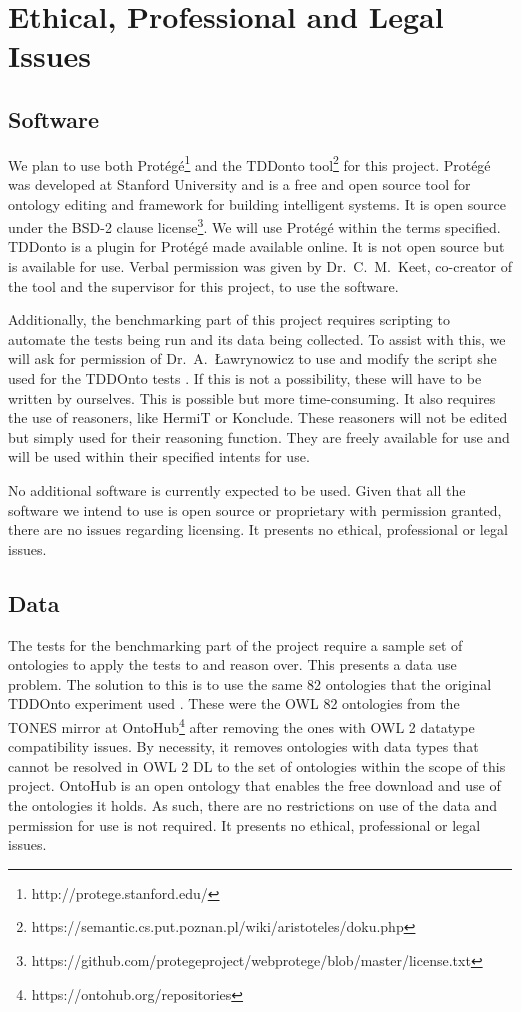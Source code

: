 \documentclass[draft]{sig-alternate}
\begin{document}
\section{Ethical, Professional and Legal Issues}

\subsection{Software}

We plan to use both Prot\'eg\'e\footnote{http://protege.stanford.edu/} and the TDDonto tool\footnote{https://semantic.cs.put.poznan.pl/wiki/aristoteles/doku.php} for this project. Prot\'eg\'e was developed at Stanford University and is a free and open source tool for ontology editing and framework for building intelligent systems. It is open source under the BSD-2 clause license\footnote{https://github.com/protegeproject/webprotege/blob/master/license.txt}. We will use Prot\'eg\'e within the terms specified. TDDonto is a plugin for Prot\'eg\'e made available online. It is not open source but is available for use. Verbal permission was given by Dr.\ C.\ M.\ Keet, co-creator of the tool and the supervisor for this project, to use the software.

Additionally, the benchmarking part of this project requires scripting to automate the tests being run and its data being collected. To assist with this, we will ask for permission of Dr.\ A.\ {\L}awrynowicz to use and modify the script she used for the TDDOnto tests \cite{DBLP:conf/dlog/LawrynowiczK16}. If this is not a possibility, these will have to be written by ourselves. This is possible but more time-consuming. It also requires the use of reasoners, like HermiT or Konclude. These reasoners will not be edited but simply used for their reasoning function. They are freely available for use and will be used within their specified intents for use.

No additional software is currently expected to be used. Given that all the software we intend to use is open source or proprietary with permission granted, there are no issues regarding licensing. It presents no ethical, professional or legal issues.

\subsection{Data}

The tests for the benchmarking part of the project require a sample set of ontologies to apply the tests to and reason over. This presents a data use problem. The solution to this is to use the same 82 ontologies that the original TDDOnto experiment used \cite{DBLP:conf/dlog/LawrynowiczK16}. These were the OWL 82 ontologies from the TONES mirror at OntoHub\footnote{https://ontohub.org/repositories} after removing the ones with OWL 2 datatype compatibility issues. By necessity, it removes ontologies with data types that cannot be resolved in OWL 2 DL to the set of ontologies within the scope of this project. OntoHub is an open ontology that enables the free download and use of the ontologies it holds. As such, there are no restrictions on use of the data and permission for use is not required. It presents no ethical, professional or legal issues.
\end{document}
